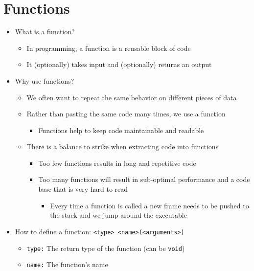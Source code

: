 \documentclass{article}
\title{}
\author{Ryan Baker}
\date{\today}
\begin{document}
\maketitle
\tableofcontents
\pagebreak

\section{Functions}

\begin{itemize}
	\item What is a function?
	\begin{itemize}
		\item In programming, a function is a reusable block of code
		\item It (optionally) takes input and (optionally) returns an output
	\end{itemize}
	\item Why use functions?
	\begin{itemize}
		\item We often want to repeat the same behavior on different pieces of data
		\item Rather than pasting the same code many times, we use a function
		\begin{itemize}
			\item Functions help to keep code maintainable and readable
		\end{itemize}
		\item There is a balance to strike when extracting code into functions
		\begin{itemize}
			\item Too few functions results in long and repetitive code
			\item Too many functions will result in sub-optimal performance and a code base that is very hard to read \begin{itemize}
				\item Every time a function is called a new frame needs to be pushed to the stack and we jump around the executable
			\end{itemize}
		\end{itemize}
	\end{itemize}
	\item How to define a function: \texttt{<type> <name>(<arguments>)}
	\begin{itemize}
		\item \texttt{type:} The return type of the function (can be \texttt{void})
		\item \texttt{name:} The function's name

\end{itemize}
\end{itemize}
\end{document}
